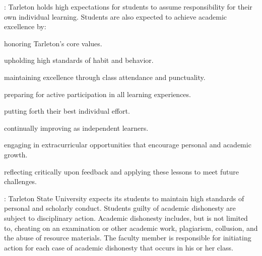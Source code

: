 \documentclass[letterpaper]{article}
\begin{document}
:  Tarleton holds high expectations for students to assume responsibility for their own individual learning.  Students are also expected to achieve academic excellence by:
\bit
  \item honoring Tarleton's core values. 
  \item upholding high standards of habit and behavior.
  \item maintaining excellence through class attendance and punctuality.
  \item preparing for active participation in all learning experiences. 
  \item putting forth their best individual effort.
  \item continually improving as independent learners.
  \item engaging in extracurricular opportunities that encourage personal and academic growth.
  \item reflecting critically upon feedback and applying these lessons to meet future challenges.
\eit

:  Tarleton State University expects its students to maintain high standards of personal and scholarly conduct.  Students guilty of academic dishonesty are subject to disciplinary action.  Academic dishonesty includes, but is not limited to, cheating on an examination or other academic work, plagiarism, collusion, and the abuse of resource materials.  The faculty member is responsible for initiating action for each case of academic dishonesty that occurs in his or her class.
\end{document}
